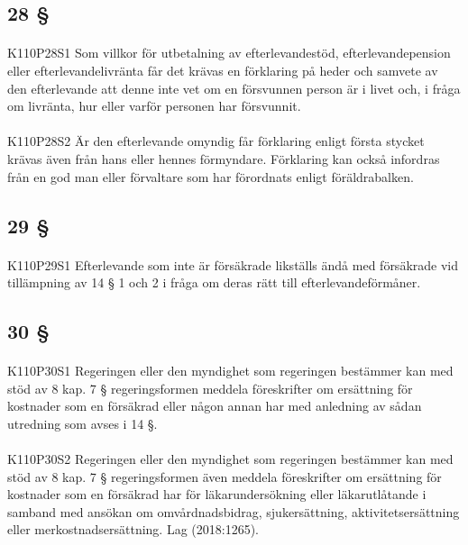 \documentclass[a4paper,notitlepage,openany,10pt]{book}
\begin{document}
\subsection*{28 §}
\paragraph*{}
{\tiny K110P28S1}
Som villkor för utbetalning av efterlevandestöd, efterlevandepension eller efterlevandelivränta får det krävas en förklaring på heder och samvete av den efterlevande att denne inte vet om en försvunnen person är i livet och, i fråga om livränta, hur eller varför personen har försvunnit.
\paragraph*{}
{\tiny K110P28S2}
Är den efterlevande omyndig får förklaring enligt första stycket krävas även från hans eller hennes förmyndare.
Förklaring kan också infordras från en god man eller förvaltare som har förordnats enligt föräldrabalken.
\subsection*{29 §}
\paragraph*{}
{\tiny K110P29S1}
Efterlevande som inte är försäkrade likställs ändå med försäkrade vid tillämpning av 14 § 1 och 2 i fråga om deras rätt till efterlevandeförmåner.
\subsection*{30 §}
\paragraph*{}
{\tiny K110P30S1}
Regeringen eller den myndighet som regeringen bestämmer kan med stöd av 8 kap. 7 § regeringsformen meddela föreskrifter om ersättning för kostnader som en försäkrad eller någon annan har med anledning av sådan utredning som avses i 14 §.
\paragraph*{}
{\tiny K110P30S2}
Regeringen eller den myndighet som regeringen bestämmer kan med stöd av 8 kap. 7 § regeringsformen även meddela föreskrifter om ersättning för kostnader som en försäkrad har för läkarundersökning eller läkarutlåtande i samband med ansökan om omvårdnadsbidrag, sjukersättning, aktivitetsersättning eller merkostnadsersättning.
Lag (2018:1265).
\end{document}
